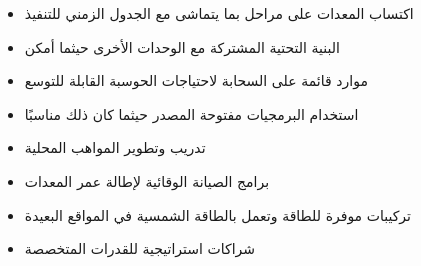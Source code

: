 \begin{itemize}
    \item اكتساب المعدات على مراحل بما يتماشى مع الجدول الزمني للتنفيذ
    \item البنية التحتية المشتركة مع الوحدات الأخرى حيثما أمكن
    \item موارد قائمة على السحابة لاحتياجات الحوسبة القابلة للتوسع
    \item استخدام البرمجيات مفتوحة المصدر حيثما كان ذلك مناسبًا
    \item تدريب وتطوير المواهب المحلية
    \item برامج الصيانة الوقائية لإطالة عمر المعدات
    \item تركيبات موفرة للطاقة وتعمل بالطاقة الشمسية في المواقع البعيدة
    \item شراكات استراتيجية للقدرات المتخصصة
\end{itemize} 